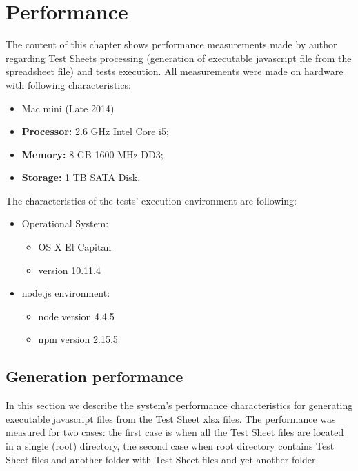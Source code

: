\chapter{Performance}
\label{chap:perfux}
The content of this chapter shows performance measurements made by author regarding Test Sheets processing (generation of executable javascript file from the spreadsheet file) and tests execution.  
All measurements were made on hardware with following characteristics:
\begin{itemize}
	\item Mac mini (Late 2014)
	\item \textbf{Processor:} 2.6 GHz Intel Core i5;
	\item \textbf{Memory:} 8 GB 1600 MHz DD3;
	\item \textbf{Storage:}  1 TB SATA Disk.
\end{itemize}

The characteristics of the tests' execution environment are following:
\begin{itemize}
\item Operational System:
\begin{itemize}
	\item OS X El Capitan
	\item version 10.11.4
\end{itemize}

\item node.js environment:
\begin{itemize}
	\item node version 4.4.5
	\item npm version 2.15.5
\end{itemize}
\end{itemize}


\section{Generation performance}
In this section we describe the system's performance characteristics for generating executable javascript files from the Test Sheet xlsx files. The performance was measured for two cases: the first case is when all the Test Sheet files are located in a single (root) directory, the second case when root directory contains Test Sheet files and another folder with Test Sheet files and yet another folder.
